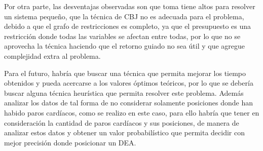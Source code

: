 \documentclass[letter, 10pt]{article}
\begin{document}
Por otra parte, las desventajas observadas son que toma tiene altos para resolver un sistema peque\~no, que la t\'ecnica de CBJ no es adecuada para el problema, debido a que el grafo de restricciones es completo, ya que el presupuesto es una restricci\'on donde todas las variables se afectan entre todas, por lo que no se aprovecha la t\'ecnica haciendo que el retorno guiado no sea \'util y que agregue complejidad extra al problema.

Para el futuro, habr\'ia que buscar una t\'ecnica que permita mejorar los tiempo obtenidos y pueda acercarse a los valores \'optimos te\'oricos, por lo que se deber\'ia buscar alguna t\'ecnica heur\'istica que permita resolver este problema. Adem\'as analizar los datos de tal forma de no considerar solamente posiciones donde han habido paros card\'iacos, como se realizo en este caso, para ello habr\'ia que tener en consideraci\'on la cantidad de paros card\'iacos y sus posiciones, de manera de analizar estos datos y obtener un valor probabil\'istico que permita decidir con mejor precisi\'on donde posicionar un DEA.


\end{document}
